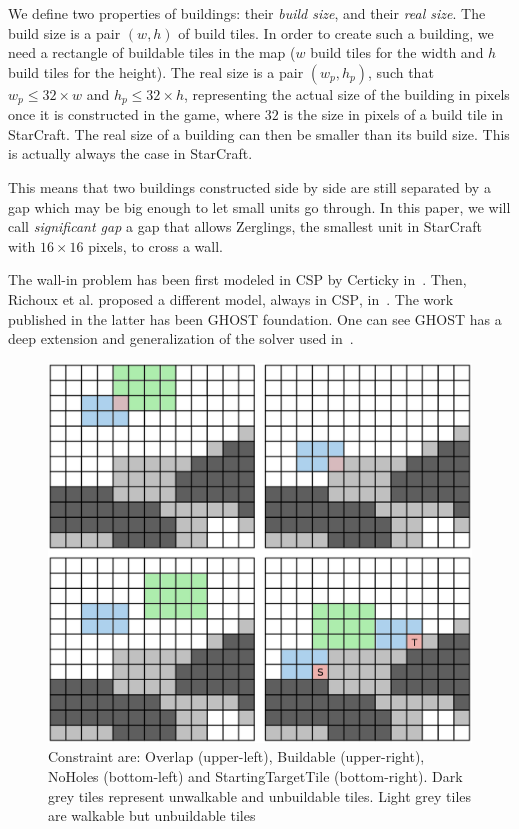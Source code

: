 \documentclass[journal]{IEEEtran}
\newcommand{\csp}{\textsc{CSP}\xspace}
\newcommand{\ghost}{\textsc{GHOST}\xspace}
\begin{document}
We define  two properties  of buildings: their  {\em build  size}, and
their {\em  real size}.  The  build size is a  pair $(w, h)$  of build
tiles. In  order to  create such  a building, we  need a  rectangle of
buildable tiles  in the map  ($w$ build tiles for the width and  $h$ build
tiles for the height). The real size is a pair $(w_p, h_p)$, such that $w_p
\leq 32 \times w$ and $h_p  \leq 32 \times h$, representing the actual
size of  the building  in pixels  once it is  constructed in  the game,
where $32$  is the size  in pixels of a  build tile in  StarCraft. The
real size of a building can then  be smaller than its build size. This
is actually always the case in StarCraft.

This  means that  two buildings  constructed  side by  side are  still
separated by a gap  which may be big enough to  let small units go through.
In this paper, we  will call {\it
  significant gap} a gap that allows Zerglings, the smallest unit in StarCraft with $16 \times 16$ pixels, to
cross a wall.

The  wall-in  problem has  been  first  modeled  in \csp  by  Certicky
in~\cite{Certicky13}. Then, Richoux et al. proposed a different model,
always  in \csp,  in~\cite{RichouxUO14}.   The work  published in  the
latter has  been \ghost  foundation.  One  can see  \ghost has  a deep
extension and generalization of the solver used in~\cite{RichouxUO14}.

\begin{figure}[htb]
  \centering
  \includegraphics[width=\columnwidth]{figs/all_constraints.png}
  \caption{Constraint    are:    Overlap    (upper-left),    Buildable
    (upper-right),   NoHoles   (bottom-left)  and   StartingTargetTile
    (bottom-right).    Dark  grey   tiles  represent   unwalkable  and
    unbuildable tiles.  Light grey  tiles are walkable but unbuildable
    tiles}
  \label{fig:wall_constraint}
\end{figure}
\end{document}
